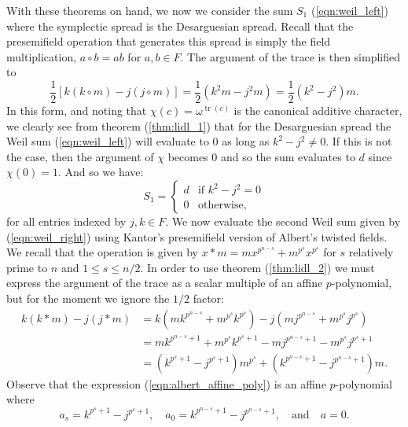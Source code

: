 \documentclass[a4paper, 11pt]{article}
\DeclareMathOperator{\tr}{tr}
\begin{document}
  With these theorems on hand, we now we consider the sum
  $S_1$ (\ref{eqn:weil_left}) where the symplectic spread is
  the Desarguesian spread. Recall that the presemifield
  operation that generates this spread is simply the field
  multiplication, $a \circ b = ab$ for $a,b \in F$. The
  argument of the trace is then simplified to
  \begin{equation}
    \frac{1}{2} \left[
      k(k\circ m) - j(j\circ m)
    \right]
    = \frac{1}{2} \left( k^2m - j^2m \right) 
    = \frac{1}{2} \left( k^2-j^2 \right) m.
  \end{equation}
  In this form, and noting that $\chi(c) = \omega^{\tr(c)}$
  is the canonical additive character, we clearly see from
  theorem (\ref{thm:lidl_1}) that for the Desarguesian
  spread the Weil sum (\ref{eqn:weil_left}) will evaluate to
  0 as long as $k^2-j^2 \neq 0$. If this is not the case,
  then the argument of $\chi$ becomes 0 and so the sum
  evaluates to $d$ since $\chi(0) = 1$. And so we have:
  \begin{equation}
    \label{eqn:weil_left_sum}
    S_1
    = \begin{cases}
      d & \text{if } k^2-j^2 = 0 \\
      0 & \text{otherwise,}
    \end{cases}
  \end{equation}
  for all entries indexed by $j, k \in F$. We now evaluate
  the second Weil sum given by (\ref{eqn:weil_right}) using
  Kantor's presemifield version of Albert's twisted fields.
  We recall that the operation is given by $x * m =
  mx^{p^{n-s}} + m^{p^{s}}x^{p^{s}}$ for $s$ relatively
  prime to $n$ and $1 \leq s \leq n / 2$.  In order to use
  theorem (\ref{thm:lidl_2}) we must express the argument of
  the trace as a scalar multiple of an affine
  $p$-polynomial, but for the moment we ignore the $1 / 2$
  factor:
  \begin{align}
    k(k*m)-j(j*m)
    &= k\left( mk^{p^{n-s}}+m^{p^{s}}k^{p^{s}} \right)
    - j\left( mj^{p^{n-s}}+m^{p^{s}}j^{p^{s}} \right) \\
    &= m k^{p^{n-s}+1} + m^{p^{s}} k^{p^{s}+1} 
    - m j^{p^{n-s} + 1} - m^{p^{s}} j^{p^{s}+1}\\
    &= \left( k^{p^{s}+1} - j^{p^{s}+1} \right) m^{p^{s}}
    + \left( k^{p^{n-s}+1} - j^{p^{n-s}+1} \right)
    m.\label{eqn:albert_affine_poly}
  \end{align}
  Observe that the expression (\ref{eqn:albert_affine_poly})
  is an affine $p$-polynomial where
  \[
    a_s = k^{p^{s}+1} - j^{p^{s}+1},
    \quad
    a_0 = k^{p^{n-s}+1} - j^{p^{n-s}+1},
    \quad
    \text{and}
    \quad
    a = 0.
  \] 
\end{document}
